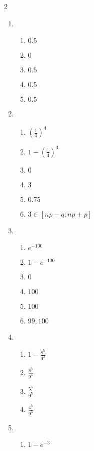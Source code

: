 \begin{multicols}{2}
\begin{enumerate}
\begin{enumerate}
		\item функция плотности не существует
	\end{enumerate}
	\item %
	\begin{enumerate}
		\item $0.5$
		\item $0$
		\item $0.5$
		\item $0.5$
		\item $0.5$
	\end{enumerate}
	\item %
	\begin{enumerate}
		\item $\left( \frac{1}{4} \right) ^4$
		\item $1 - \left( \frac{1}{4} \right) ^4$
		\item $0$
		\item $3$
		\item $0.75$
		\item $3 \in [np -q; np+p]$
	\end{enumerate}
	\item %
	\begin{enumerate}
		\item $e^{-100}$
		\item $1 - e^{-100}$
		\item $0$
		\item $100$
		\item $100$
		\item $99, 100$
	\end{enumerate}
	\item %
	\begin{enumerate}
		\item $1 - \frac{8^5}{9^5}$
		\item $\frac{8^5}{9^5}$
		\item $\frac{5^5}{9^5}$
		\item $\frac{4^5}{9^5}$
	\end{enumerate}
	\item %
	\begin{enumerate}
		\item $1 - e^{-3}$

\end{enumerate}
\end{enumerate}
\end{multicols}
